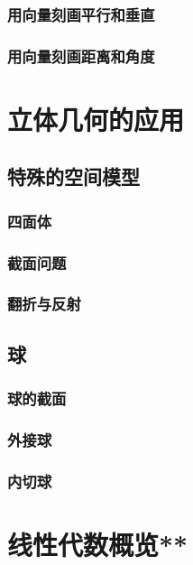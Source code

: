 \clearpage
\subsection{用向量刻画平行和垂直}
\clearpage
\subsection{用向量刻画距离和角度}
\clearpage


\chapter{立体几何的应用}

\section{特殊的空间模型}
\subsection{四面体}
\clearpage
\subsection{截面问题}
\clearpage
\subsection{翻折与反射}
\clearpage


\section{球}
\subsection{球的截面}
\clearpage
\subsection{外接球}
\clearpage
\subsection{内切球}
\clearpage









\chapter{线性代数概览**}%
